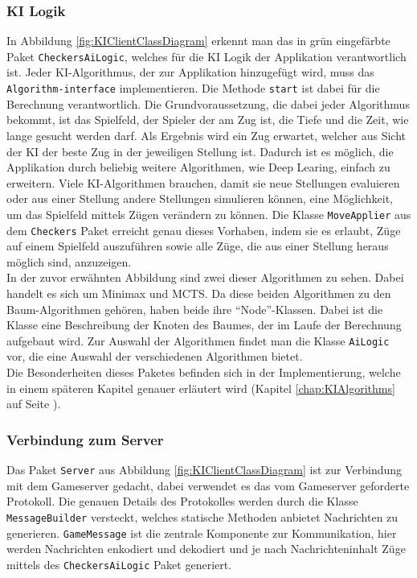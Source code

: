 \documentclass[12pt,a4paper,bibliography=totocnumbered,listof=totocnumbered]{article}
\begin{document}
\subsubsection{\ac{KI} Logik}
In Abbildung \ref{fig:KIClientClassDiagram} erkennt man das in grün eingefärbte Paket \texttt{CheckersAiLogic}, welches für die \ac{KI} Logik der Applikation verantwortlich ist.
Jeder \ac{KI}-Algorithmus, der zur Applikation hinzugefügt wird, muss das \texttt{Algorithm-interface} implementieren. Die Methode \texttt{start} ist dabei für die Berechnung 
verantwortlich. Die Grundvoraussetzung, die dabei jeder Algorithmus bekommt, ist das Spielfeld, der Spieler der am Zug ist, die Tiefe und die Zeit, wie lange gesucht werden darf.
Als Ergebnis wird ein Zug erwartet, welcher aus Sicht der \ac{KI} der beste Zug in der jeweiligen Stellung ist. Dadurch ist es möglich, die Applikation durch beliebig weitere 
Algorithmen, wie Deep Learing, einfach zu erweitern. 
Viele \ac{KI}-Algorithmen brauchen, damit sie neue Stellungen evaluieren oder aus einer Stellung andere Stellungen simulieren können, eine Möglichkeit, um das Spielfeld mittels 
Zügen verändern zu können. Die Klasse \texttt{MoveApplier} aus dem \texttt{Checkers} Paket erreicht genau dieses Vorhaben, indem sie es erlaubt, Züge auf einem Spielfeld auszuführen 
sowie alle Züge, die aus einer Stellung heraus möglich sind, anzuzeigen.
\\
In der zuvor erwähnten Abbildung sind zwei dieser Algorithmen zu sehen. Dabei handelt es sich um Minimax und \ac{MCTS}. Da diese beiden Algorithmen zu den Baum-Algorithmen
gehören, haben beide ihre ``Node''-Klassen. Dabei ist die Klasse eine Beschreibung der Knoten des Baumes, der im Laufe der Berechnung aufgebaut wird.
Zur Auswahl der Algorithmen findet man die Klasse \texttt{AiLogic} vor, die eine Auswahl der verschiedenen Algorithmen bietet. 
\\ 
Die Besonderheiten dieses Paketes befinden sich in der Implementierung, welche in einem späteren Kapitel genauer erläutert wird 
(Kapitel \ref{chap:KIAlgorithms} auf Seite \pageref{chap:KIAlgorithms}).

\subsubsection{Verbindung zum Server}
Das Paket \texttt{Server} aus Abbildung \ref{fig:KIClientClassDiagram} ist zur Verbindung mit dem Gameserver gedacht, dabei verwendet es das vom Gameserver geforderte 
Protokoll. Die genauen Details des Protokolles werden durch die Klasse \texttt{MessageBuilder} versteckt, welches statische Methoden anbietet Nachrichten zu generieren.
\texttt{GameMessage} ist die zentrale Komponente zur Kommunikation, hier werden Nachrichten enkodiert und dekodiert und je nach Nachrichteninhalt 
Züge mittels des \texttt{CheckersAiLogic} Paket generiert.
\end{document}
